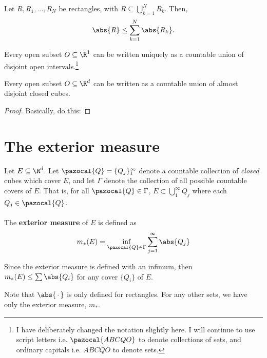 \documentclass[a5paper, oneside]{book}
\numberwithin{theorem}{chapter}
\renewcommand{\script}[1]{\pazocal{#1}}
\begin{document}
\begin{lemma}
Let $R, R_1, \dots , R_N$ be rectangles, with $R\subseteq	\bigcup\limits_{k=1}^N R_k$. Then,
$$\abs{R}\leq\sum_{k=1}^N \abs{R_k}.$$
\end{lemma}

\begin{theorem}
Every open subset $O\subseteq\R^1$ can be written uniquely as a countable union of disjoint open intervals.\footnote{I have deliberately changed the notation slightly here. I will continue to use script letters i.e. $\script{ABCQO}$ to denote collections of sets, and ordinary capitals i.e. $ABCQO$ to denote sets.}
\end{theorem}

\begin{theorem}
Every open subset $O\subseteq\R^d$ can be written as a countable union of almost disjoint closed cubes.
\end{theorem}
\begin{proof}
Basically, do this: 
\end{proof}
\pagebreak
\section{The exterior measure}

\begin{highlight}
\begin{definition*}
Let $E\subseteq \R^d$. Let $\script{Q}=\{Q_j\}_1^\infty$ denote a countable collection of \emph{closed} cubes which cover $E$, and let $\Gamma$ denote the collection of all possible countable covers of $E$. That is, for all $\script{Q}\in\Gamma$, $E\subset\bigcup_1^\infty Q_j$ where each $Q_j\in \script{Q}$. \\
\\
The \textbf{exterior measure} of $E$ is defined as 
$$m_*(E)=\inf_{\script{Q}\in\Gamma} \sum_{j=1}^\infty \abs{Q_j}$$
\end{definition*}
\end{highlight}

\begin{remark*}
Since the exterior measure is defined with an infimum, then $m_*(E)\leq \sum\abs{Q_i}$ for any cover $\{Q_i\}$ of $E$.
\end{remark*}
\begin{remark*}
Note that $\abs{\,\cdot\,}$ is only defined for rectangles. For any other sets, we have only the exterior measure, $m_*$. 
\end{remark*}
\end{document}
